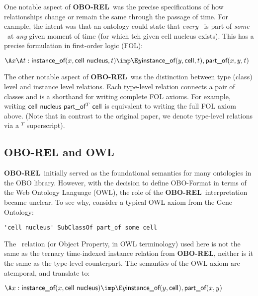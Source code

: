 \documentclass{bioinfo}
\def\partOfT{\pr{part\_of$^T$}}
\def\partOf{\pr{part\_of}}
\def\instanceOf{\pr{instance\_of}}
\def\CellNucleus{\pr{cell nucleus}}
\def\Cell{\pr{cell}}
\def\OBOREL{\textbf{OBO-REL}}
\begin{document}
One notable aspect of \OBOREL\ was the precise specifications of how
relationships change or remain the same through the passage of
time. For example, the intent was that an ontology could state that
\emph{every} \CellNucleus\ is part of \emph{some} \Cell\ at \emph{any}
given moment of time (for which teh given cell nucleus exists). This
has a precise formulation in first-order logic (FOL):

$
\A x \A t : \instanceOf(x, \CellNucleus, t) \imp \\
 \E y \instanceOf(y, \Cell, t), \partOf(x,y,t)
$


The other notable aspect of \OBOREL\ was the distinction between type
(class) level and instance level relations. Each type-level relation
connects a pair of classes and is a shorthand for writing complete FOL
axioms. For example, writing $\CellNucleus\ \partOfT\ \Cell$ is
equivalent to writing the full FOL axiom above. (Note that in contrast
to the original paper, we denote type-level relations via a $^T$
superscript).

\subsection{OBO-REL and OWL}

\OBOREL\ initially served as the foundational semantics for many
ontologies in the OBO library\cite{Smith2007}. However, with the
decision to define OBO-Format in terms of the Web Ontology Language
(OWL)\cite{golbreich2007obo,OBOFormat}, the role of the \OBOREL\
interpretation became unclear. To see why, consider a typical OWL
axiom from the Gene Ontology\cite{Ashburner2000}:

\begin{verbatim}
'cell nucleus' SubClassOf part_of some cell
\end{verbatim}

The \partOf\ relation (or Object Property, in OWL terminology) used
here is not the same as the ternary time-indexed instance relation
from \OBOREL, neither is it the same as the type-level
counterpart. The semantics of the OWL axiom are atemporal, and
translate to:

$
\A x : \instanceOf(x, \CellNucleus) \imp \\
 \E y \instanceOf(y, \Cell), \partOf(x,y)
$
\end{document}
